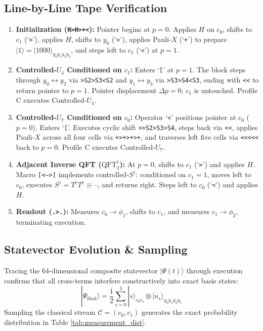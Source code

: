 \documentclass[11pt,a4paper,twocolumn]{article}
\newcommand{\ket}[1]{| #1 \rangle}
\begin{document}
\subsection{Line-by-Line Tape Verification}
\begin{enumerate}
    \item \textbf{Initialization (\texttt{H>H>+<}):} Pointer begins at $p = 0$. Applies $H$ on $c_0$, shifts to $c_1$ (`\texttt{>}'), applies $H$, shifts to $y_0$ (`\texttt{>}'), applies Pauli-$X$ (`\texttt{+}') to prepare $\ket{1} = \ket{1000}_{y_0 y_1 y_2 y_3}$, and steps left to $c_1$ (`\texttt{<}') at $p = 1$.
    \item \textbf{Controlled-$U_4$ Conditioned on $c_1$:} Enters `\texttt{[}' at $p = 1$. The block steps through $y_0 \leftrightarrow y_2$ via \texttt{>S2>S3<S2} and $y_1 \leftrightarrow y_3$ via \texttt{>S3>S4<S3}, ending with \texttt{<<} to return pointer to $p = 1$. Pointer displacement $\Delta p = 0$; $c_1$ is untouched. Profile C executes Controlled-$U_4$.
    \item \textbf{Controlled-$U_7$ Conditioned on $c_0$:} Operator `\texttt{<}' positions pointer at $c_0$ ($p = 0$). Enters `\texttt{[}'. Executes cyclic shift \texttt{>>S2>S3>S4}, steps back via \texttt{<<}, applies Pauli-$X$ across all four cells via \texttt{+>+>+>+}, and traverses left five cells via \texttt{<<<<<} back to $p = 0$. Profile C executes Controlled-$U_7$.
    \item \textbf{Adjacent Inverse QFT ($\text{QFT}_2^\dagger$):} At $p = 0$, shifts to $c_1$ (`\texttt{>}') and applies $H$. Macro \texttt{[<-->]} implements controlled-$S^\dagger$: conditioned on $c_1 = 1$, moves left to $c_0$, executes $S^\dagger = T^\dagger T^\dagger \equiv \texttt{--}$, and returns right. Steps left to $c_0$ (`\texttt{<}') and applies $H$.
    \item \textbf{Readout (\texttt{.>.}):} Measures $c_0 \to \phi_1$, shifts to $c_1$, and measures $c_1 \to \phi_2$, terminating execution.
\end{enumerate}

\subsection{Statevector Evolution \& Sampling}

Tracing the 64-dimensional composite statevector $\ket{\Psi(t)}$ through execution confirms that all cross-terms interfere constructively into exact basis states:
\begin{equation}
    \ket{\Psi_{\text{final}}} = \frac{1}{2}\sum_{s=0}^3 \ket{s}_{c_0 c_1} \otimes \ket{u_s}_{y_0 y_1 y_2 y_3}
\end{equation}
Sampling the classical stream $\mathcal{C} = (c_0, c_1)$ generates the exact probability distribution in Table \ref{tab:measurement_dist}.
\end{document}
